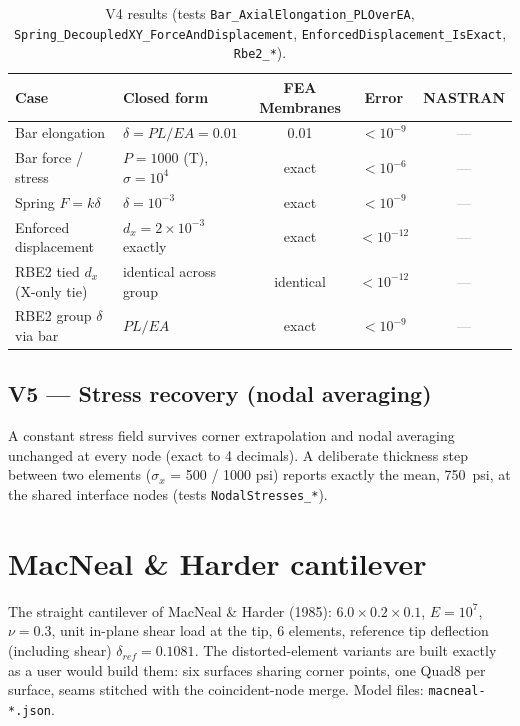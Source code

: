 \documentclass[11pt,a4paper]{report}
\newcommand{\nast}{\textcolor{gray}{---}} %
\begin{document}
\begin{table}[H]\centering\small
\begin{tabular}{@{}llccc@{}}
\toprule
Case & Closed form & FEA Membranes & Error & NASTRAN \\
\midrule
Bar elongation & $\delta = PL/EA = 0.01$ & 0.01 & $<10^{-9}$ & \nast \\
Bar force / stress & $P{=}1000$ (T), $\sigma{=}10^4$ & exact & $<10^{-6}$ & \nast \\
Spring $F = k\delta$ & $\delta = 10^{-3}$ & exact & $<10^{-9}$ & \nast \\
Enforced displacement & $d_x = 2\times10^{-3}$ exactly & exact & $<10^{-12}$ & \nast \\
RBE2 tied $d_x$ (X-only tie) & identical across group & identical & $<10^{-12}$ & \nast \\
RBE2 group $\delta$ via bar & $PL/EA$ & exact & $<10^{-9}$ & \nast \\
\bottomrule
\end{tabular}
\caption{V4 results (tests \texttt{Bar\_AxialElongation\_PLOverEA},
\texttt{Spring\_DecoupledXY\_ForceAndDisplacement},
\texttt{EnforcedDisplacement\_IsExact}, \texttt{Rbe2\_*}).}
\end{table}

\section{V5 --- Stress recovery (nodal averaging)}
A constant stress field survives corner extrapolation and nodal averaging
unchanged at every node (exact to 4 decimals). A deliberate thickness step
between two elements ($\sigma_x$ = 500 / 1000 psi) reports exactly the mean,
750~psi, at the shared interface nodes (tests
\texttt{NodalStresses\_*}).

\chapter{MacNeal \& Harder cantilever}
\label{sec:macneal}

The straight cantilever of MacNeal \& Harder (1985): $6.0\times0.2\times0.1$,
$E=10^7$, $\nu=0.3$, unit in-plane shear load at the tip, 6 elements,
reference tip deflection (including shear) $\delta_{ref}=0.1081$. The
distorted-element variants are built exactly as a user would build them: six
surfaces sharing corner points, one Quad8 per surface, seams stitched with the
coincident-node merge. Model files: \texttt{macneal-*.json}.
\end{document}
